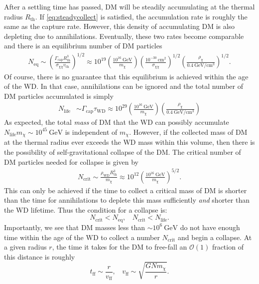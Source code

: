 \documentclass[preprintnumbers,amsmath,amssymb,prd,superscriptaddress]{revtex4}
\newcommand{\OO}{\mathcal{O}}
\newcommand{\GeV}{\text{GeV}}
\newcommand{\cm}{\text{cm}}
\def\r{\right)}
\def\l{\left(}
\begin{document}
After a settling time has passed, DM will be steadily accumulating at the thermal radius $R_\text{th}$.
If \eqref{eq:steadycollect} is satisfied, the accumulation rate is roughly the same as the capture rate. 
However, this density of accumulating DM is also depleting due to annihilations. 
Eventually, these two rates become comparable and there is an equilibrium number of DM particles
\begin{align}
N_\text{eq} \sim \l \frac{\Gamma_\text{cap} R_\text{th}^3}{\sigma_{\chi \chi} v_\text{th}} \r^{1/2} \approx 10^{19} \l \frac{10^{16} ~\GeV}{m_\chi} \r \l \frac{10^{-30} ~\cm^2}{\sigma_{\chi \chi}} \r^{1/2} \l \frac{\rho_\chi}{0.4 ~\GeV/\cm^3} \r^{1/2}.
\end{align}
Of course, there is no guarantee that this equilibrium is achieved within the age of the WD. 
In that case, annihilations can be ignored and the total number of DM particles accumulated is simply
\begin{align}
N_\text{life} &\sim \Gamma_\text{cap} \tau_\text{WD} \approx 10^{29}  \l \frac{10^{16} ~\GeV}{m_\chi} \r \l \frac{\rho_\chi}{0.4 ~\GeV/\cm^3} \r
\end{align}
As expected, the total \emph{mass} of DM that the WD can possibly accumulate $N_\text{life} m_\chi \sim 10^{45} ~\GeV$ is independent of $m_\chi$. 
However, if the collected mass of DM at the thermal radius ever exceeds the WD mass within this volume, then there is the possibility of self-gravitational collapse of the DM.
The critical number of DM particles needed for collapse is given by
\begin{align}
\label{eq:Ncore}
    N_\text{crit} \sim \frac{\rho_\text{WD} R^3_\text{th}}{m_\chi} \approx 10^{12} \l \frac{10^{16} ~\GeV}{m_\chi} \r^{5/2}.
\end{align}
This can only be achieved if the time to collect a critical mass of DM is shorter than the time for annihilations to deplete this mass sufficiently \emph{and} shorter than the WD lifetime. 
Thus the condition for a collapse is:
\begin{equation}
\label{eq:collapsecondition}
N_\text{crit} < N_\text{eq}, ~~~~ N_\text{crit} < N_\text{life}. 
\end{equation}
Importantly, we see that DM masses less than $\sim 10^{6} ~\GeV$ do not have enough time within the age of the WD to collect a number $N_\text{crit}$ and begin a collapse.
At a given radius $r$, the time it takes for the DM to free-fall an $\OO(1)$ fraction of this distance is roughly
\begin{equation}
\label{eq:freefalltime}
t_\text{ff} \sim \frac{r}{v_\text{ff}}, ~~~~ v_\text{ff} \sim \sqrt{\frac{G N m_\chi}{r}}.
\end{equation}
\end{document}
